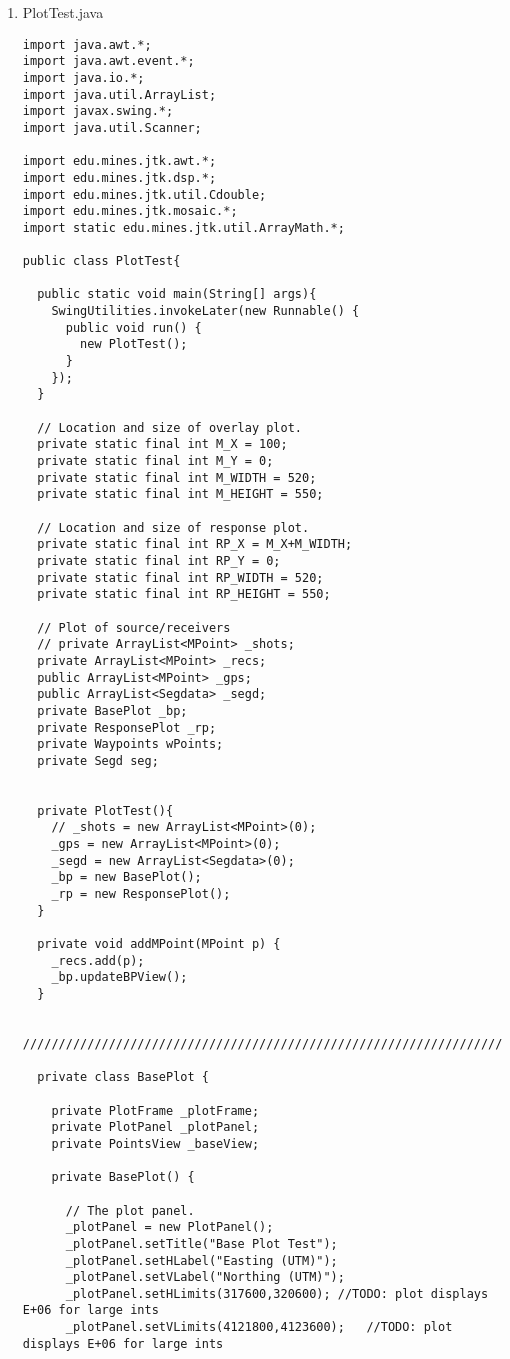 \documentclass[11pt]{article}
\begin{document}
\begin{enumerate}
\item PlotTest.java
\begin{lstlisting}
import java.awt.*;
import java.awt.event.*;
import java.io.*;
import java.util.ArrayList;
import javax.swing.*;
import java.util.Scanner;

import edu.mines.jtk.awt.*;
import edu.mines.jtk.dsp.*;
import edu.mines.jtk.util.Cdouble;
import edu.mines.jtk.mosaic.*;
import static edu.mines.jtk.util.ArrayMath.*;

public class PlotTest{

  public static void main(String[] args){
    SwingUtilities.invokeLater(new Runnable() {
      public void run() {
        new PlotTest();
      }
    });
  }

  // Location and size of overlay plot.
  private static final int M_X = 100;
  private static final int M_Y = 0;
  private static final int M_WIDTH = 520;
  private static final int M_HEIGHT = 550;

  // Location and size of response plot.
  private static final int RP_X = M_X+M_WIDTH;
  private static final int RP_Y = 0;
  private static final int RP_WIDTH = 520;
  private static final int RP_HEIGHT = 550;
  
  // Plot of source/receivers
  // private ArrayList<MPoint> _shots;
  private ArrayList<MPoint> _recs;
  public ArrayList<MPoint> _gps;
  public ArrayList<Segdata> _segd;
  private BasePlot _bp;
  private ResponsePlot _rp;
  private Waypoints wPoints;
  private Segd seg;


  private PlotTest(){
    // _shots = new ArrayList<MPoint>(0);
    _gps = new ArrayList<MPoint>(0);
    _segd = new ArrayList<Segdata>(0);
    _bp = new BasePlot();
    _rp = new ResponsePlot();
  }

  private void addMPoint(MPoint p) {
    _recs.add(p);
    _bp.updateBPView();
  }


///////////////////////////////////////////////////////////////////////////

  private class BasePlot {

    private PlotFrame _plotFrame;
    private PlotPanel _plotPanel;
    private PointsView _baseView;
    
    private BasePlot() {

      // The plot panel.
      _plotPanel = new PlotPanel();
      _plotPanel.setTitle("Base Plot Test");
      _plotPanel.setHLabel("Easting (UTM)");
      _plotPanel.setVLabel("Northing (UTM)");
      _plotPanel.setHLimits(317600,320600); //TODO: plot displays E+06 for large ints
      _plotPanel.setVLimits(4121800,4123600);   //TODO: plot displays E+06 for large ints


\end{lstlisting}
\end{enumerate}
\end{document}
